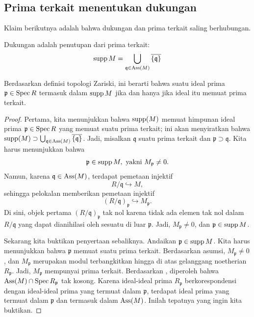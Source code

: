\subsection{Prima terkait menentukan dukungan}
Klaim berikutnya adalah bahwa dukungan dan prima terkait saling berhubungan.

\begin{proposition}\label{supportassociated} Dukungan adalah penutupan dari prima terkait:
\[ \operatorname{supp} M  = \bigcup_{\mathfrak{q} \in \operatorname{Ass}(M)}
\overline{\left\{\mathfrak{q}\right\}} \]
\end{proposition} 

Berdasarkan definisi topologi Zariski, ini berarti bahwa suatu ideal prima $\mathfrak{p}
\in \operatorname{Spec} R$ termasuk dalam $\operatorname{supp} M$ jika dan hanya jika ideal itu memuat prima
terkait. 

\begin{proof} 
Pertama, kita menunjukkan bahwa $\operatorname{supp}(M)$ memuat himpunan ideal prima
$\mathfrak{p} \in \operatorname{Spec} R$ yang memuat suatu prima terkait; ini akan menyiratkan
bahwa $\operatorname{supp}(M) \supset \bigcup_{\mathfrak{q} \in \operatorname{Ass}(M)}
\overline{\left\{\mathfrak{q}\right\}}$. Jadi, misalkan $\mathfrak{q}$ suatu
prima terkait dan $\mathfrak{p} \supset \mathfrak{q}$. Kita harus menunjukkan bahwa
\[ \mathfrak{p} \in \operatorname{supp} M, \ \text{yakni} \ M_{\mathfrak{p}} \neq 0.  \]
Namun, karena $\mathfrak{q} \in \operatorname{Ass}(M)$, terdapat pemetaan injektif
\[ R/\mathfrak{q} \hookrightarrow M , \]
sehingga pelokalan memberikan pemetaan injektif
\[ (R/\mathfrak{q})_{\mathfrak{p}} \hookrightarrow M_{\mathfrak{p}}.  \]
Di sini, objek pertama $(R/\mathfrak{q})_{\mathfrak{p}}$ tak nol karena tidak ada elemen tak nol dalam $R/\mathfrak{q}$ yang dapat
dianihilasi oleh sesuatu di luar $\mathfrak{p}$. Jadi, $M_{\mathfrak{p}} \neq
0$, dan $\mathfrak{p} \in \operatorname{supp} M$. 

Sekarang kita buktikan penyertaan sebaliknya. Andaikan $\mathfrak{p} \in \operatorname{supp} M$. Kita
harus menunjukkan bahwa $\mathfrak{p}$ memuat suatu prima terkait.  
Berdasarkan asumsi, $M_{\mathfrak{p}} \neq 0$, dan $M_{\mathfrak{p}}$ merupakan modul
terbangkitkan hingga di atas gelanggang noetherian $R_{\mathfrak{p}}$. Jadi, $M_{\mathfrak{p}}$ mempunyai
prima terkait.
Berdasarkan , diperoleh bahwa $\operatorname{Ass}(M) \cap \operatorname{Spec}
R_{\mathfrak{p}}$ tak kosong. Karena ideal-ideal prima $R_{\mathfrak{p}}$
berkorespondensi dengan ideal-ideal prima yang termuat dalam $\mathfrak{p}$, terdapat
ideal prima yang termuat dalam $\mathfrak{p}$ dan termasuk dalam $\operatorname{Ass}(M)$. Inilah
tepatnya yang ingin kita buktikan.
\end{proof} 


